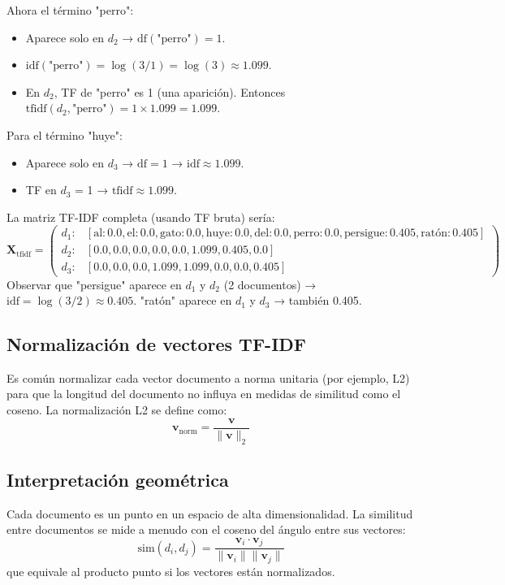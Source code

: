 \documentclass[12pt,a4paper,openany,oneside]{book}
\begin{document}
Ahora el término "perro":
\begin{itemize}
    \item Aparece solo en \(d_2\) → \(\text{df}(\text{"perro"}) = 1\).
    \item \(\text{idf}(\text{"perro"}) = \log(3/1) = \log(3) \approx 1.099\).
    \item En \(d_2\), TF de "perro" es 1 (una aparición). Entonces \(\text{tfidf}(d_2, \text{"perro"}) = 1 \times 1.099 = 1.099\).
\end{itemize}

Para el término "huye":
\begin{itemize}
    \item Aparece solo en \(d_3\) → \(\text{df} = 1\) → \(\text{idf} \approx 1.099\).
    \item TF en \(d_3\) = 1 → \(\text{tfidf} \approx 1.099\).
\end{itemize}

La matriz TF-IDF completa (usando TF bruta) sería:
\[
\mathbf{X}_{\text{tfidf}} = \begin{pmatrix}
d_1: & [\text{al}: 0.0, \text{el}: 0.0, \text{gato}: 0.0, \text{huye}: 0.0, \text{del}: 0.0, \text{perro}: 0.0, \text{persigue}: 0.405, \text{ratón}: 0.405] \\
d_2: & [0.0, 0.0, 0.0, 0.0, 0.0, 1.099, 0.405, 0.0] \\
d_3: & [0.0, 0.0, 0.0, 1.099, 1.099, 0.0, 0.0, 0.405]
\end{pmatrix}
\]
Observar que "persigue" aparece en \(d_1\) y \(d_2\) (2 documentos) → \(\text{idf} = \log(3/2) \approx 0.405\). "ratón" aparece en \(d_1\) y \(d_3\) → también 0.405.

\subsection{Normalización de vectores TF-IDF}
Es común normalizar cada vector documento a norma unitaria (por ejemplo, L2) para que la longitud del documento no influya en medidas de similitud como el coseno. La normalización L2 se define como:
\[
\mathbf{v}_{\text{norm}} = \frac{\mathbf{v}}{\|\mathbf{v}\|_2}
\]

\subsection{Interpretación geométrica}
Cada documento es un punto en un espacio de alta dimensionalidad. La similitud entre documentos se mide a menudo con el coseno del ángulo entre sus vectores:
\[
\text{sim}(d_i, d_j) = \frac{\mathbf{v}_i \cdot \mathbf{v}_j}{\|\mathbf{v}_i\| \|\mathbf{v}_j\|}
\]
que equivale al producto punto si los vectores están normalizados.
\end{document}
